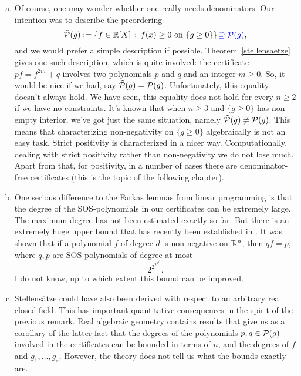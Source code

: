 \begin{enumerate}[(a)]
		\item Of course, one may wonder whether one really needs denominators. Our  intention was to describe the preordering 
		\[
		\Tilde{\mathcal{P}}(g):=\left\{ f \in \mathbb{R}[X] \,:\, f(x) \ge 0 \ \text{on} \ \{g \ge 0\} \right\} \textcolor{blue}{\supseteq \mathcal{P}(g)},
		\] 
		and we would prefer a simple description if possible. Theorem~\ref{stellensaetze} gives one such description, which is quite involved: the certificate $p f = f^{2m} + q$ involves two polynomials $p$ and $q$ and an integer $m \ge 0$. So, it would be nice if we had, say $\Tilde{\mathcal{P}}(g)=\mathcal{P}(g)$. Unfortunately, this equality doesn't always hold. We have seen, this equality does not hold for every $n \ge 2$  if we have no constraints. It's known that when $n \ge 3$ and $\{g \ge 0\}$ has non-empty interior, we've got just the same situation, namely $\Tilde{\mathcal{P}}(g) \ne \mathcal{P}(g)$. This means that characterizing non-negativity on $\{g \ge 0\}$ algebraically is not an easy task. Strict positivity is characterized in a nicer way. Computationally, dealing with strict positivity rather than non-negativity we do not lose much. Apart from that, for positivity, in a number of cases there are denominator-free certificates (this is the topic of the following chapter).
		\item One serious difference to the Farkas lemmas from linear programming is that the degree of the SOS-polynomials in our certificates can be extremely large. The maximum degree has not been estimated exactly so far. But there is an extremely huge upper bound that has recently been established in \cite{lombardi2014elementary}. It was shown that if a polynomial $f$ of degree $d$ is non-negative on $\mathbb{R}^n$, then $q f = p$, where $q,p$ are SOS-polynomials of degree at most 
		\[
			2^{2^{2^{d^{4^n}}}}.
		\]
		I do not know, up to which extent this bound can be improved. 
		\item Stellensätze could have also been derived with respect to an arbitrary real closed field. This has important quantitative consequences in the spirit of the previous remark. Real algebraic geometry contains results that give us as a corollary of the latter fact that the degrees of the polynomials $p,q \in \mathcal{P}(g)$ involved in the certificates can be bounded in terms of $n$, and the degrees of $f$ and $g_1,\ldots,g_s$. However, the theory does not tell us what the bounds exactly are. 
	\end{enumerate}


